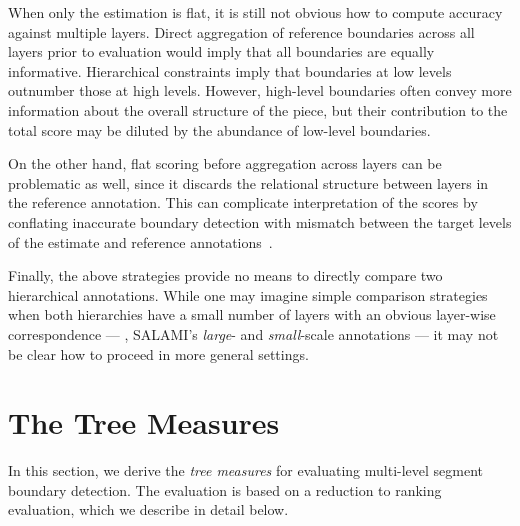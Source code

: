 \documentclass{article}
\begin{document}
When only the estimation is flat, it is still not obvious how to compute accuracy against multiple layers.
Direct aggregation of reference boundaries across all layers prior to evaluation would imply 
that all boundaries are equally informative.
Hierarchical constraints imply that boundaries at low levels outnumber those at high levels.
However, high-level boundaries often convey more information about the overall structure of the piece, but
their contribution to the total score may be diluted by the abundance of low-level boundaries.

On the other hand, flat scoring before aggregation across layers can be problematic as well, 
since it discards the relational structure between layers in the reference annotation.
This can complicate interpretation of the scores by conflating inaccurate boundary detection
with mismatch between the target levels of the estimate and reference annotations~\cite{Smith2013}.

Finally, the above strategies provide no means to directly compare two hierarchical annotations.
While one may imagine simple comparison strategies when both hierarchies have a small
number of layers with an obvious layer-wise correspondence 
--- \eg, SALAMI's \emph{large}- and \emph{small}-scale annotations --- it may not be clear how to proceed in
more general settings.



\section{The Tree Measures}\label{sec:eval_desc}
\sloppy
In this section, we derive the \emph{tree measures} for evaluating multi-level segment boundary detection.
The evaluation is based on a reduction to ranking evaluation, which we describe in detail below.
\end{document}

